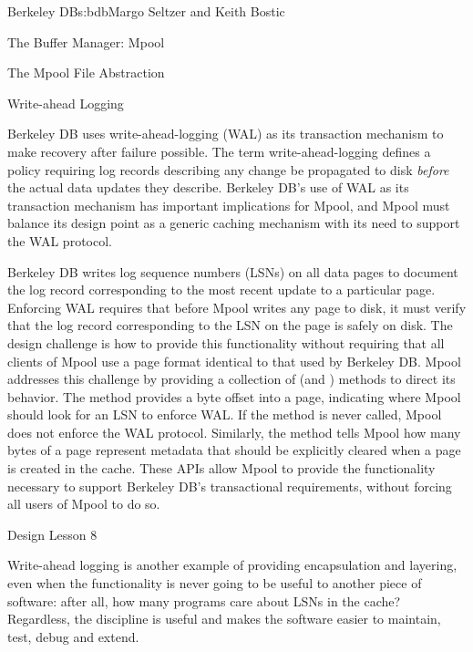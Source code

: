 \begin{aosachapter}{Berkeley DB}{s:bdb}{Margo Seltzer and Keith Bostic}
\begin{aosasect1}{The Buffer Manager: Mpool}
\begin{aosasect2}{The Mpool File Abstraction}
\end{aosasect2}

\begin{aosasect2}{ Write-ahead Logging}

Berkeley DB uses write-ahead-logging (WAL) as its transaction
mechanism to make recovery after failure possible.  The term
write-ahead-logging defines a policy requiring log records describing
any change be propagated to disk \emph{before} the actual data updates
they describe. Berkeley DB's use of WAL as its transaction mechanism
has important implications for Mpool, and Mpool must balance its
design point as a generic caching mechanism with its need to support
the WAL protocol.

Berkeley DB writes log sequence numbers (LSNs) on all data pages to
document the log record corresponding to the most recent update to a
particular page.  Enforcing WAL requires that before Mpool writes any
page to disk, it must verify that the log record corresponding to the
LSN on the page is safely on disk.  The design challenge is how to
provide this functionality without requiring that all clients of Mpool
use a page format identical to that used by Berkeley DB\@. Mpool
addresses this challenge by providing a collection of  (and
) methods to direct its behavior.  The  method
 provides a byte offset into a page, indicating
where Mpool should look for an LSN to enforce WAL\@.  If the method is
never called, Mpool does not enforce the WAL protocol. Similarly, the
 method tells Mpool how many bytes of a page
represent metadata that should be explicitly cleared when a page is
created in the cache. These APIs allow Mpool to provide the
functionality necessary to support Berkeley DB's transactional
requirements, without forcing all users of Mpool to do so. 

\begin{aosabox}{Design Lesson 8}

Write-ahead logging is another example of providing encapsulation and
layering, even when the functionality is never going to be useful to
another piece of software: after all, how many programs care about
LSNs in the cache?  Regardless, the discipline is useful and makes the
software easier to maintain, test, debug and extend.

\end{aosabox}

\end{aosasect2}


\end{aosasect1}
\end{aosachapter}
